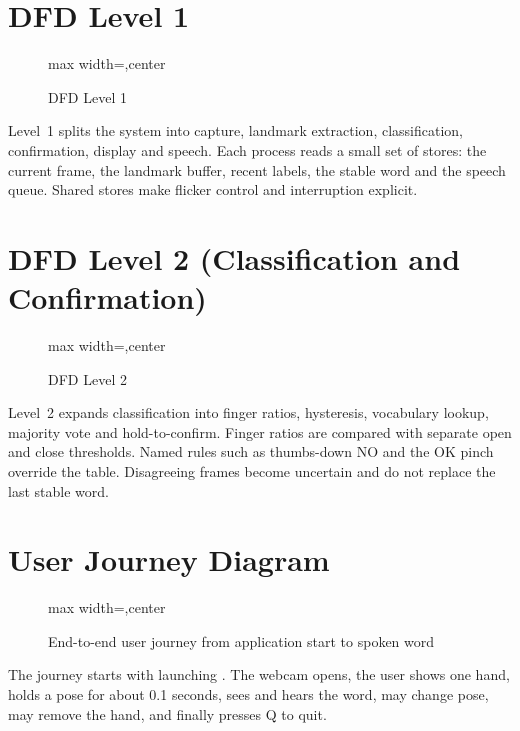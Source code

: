 \section{DFD Level 1}
\begin{figure}[H]
\centering
\begin{adjustbox}{max width=\textwidth,center}

\end{adjustbox}
\caption{DFD Level 1}
\label{fig:dfd1}
\end{figure}

Level~1 splits the system into capture, landmark extraction, classification, confirmation, display and speech. Each process reads a small set of stores: the current frame, the landmark buffer, recent labels, the stable word and the speech queue. Shared stores make flicker control and interruption explicit.

\section{DFD Level 2 (Classification and Confirmation)}
\begin{figure}[H]
\centering
\begin{adjustbox}{max width=\textwidth,center}

\end{adjustbox}
\caption{DFD Level 2}
\label{fig:dfd2}
\end{figure}

Level~2 expands classification into finger ratios, hysteresis, vocabulary lookup, majority vote and hold-to-confirm. Finger ratios are compared with separate open and close thresholds. Named rules such as thumbs-down NO and the OK pinch override the table. Disagreeing frames become uncertain and do not replace the last stable word.

\section{User Journey Diagram}
\begin{figure}[H]
\centering
\begin{adjustbox}{max width=\textwidth,center}

\end{adjustbox}
\caption{End-to-end user journey from application start to spoken word}
\label{fig:journey}
\end{figure}

The journey starts with launching . The webcam opens, the user shows one hand, holds a pose for about 0.1 seconds, sees and hears the word, may change pose, may remove the hand, and finally presses Q to quit.

